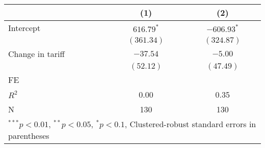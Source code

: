 
\begin{tabular}{l c c }
\hline
 & (1) & (2) \\
\hline
Intercept & $616.79^{*}$ & $-606.93^{*}$ \\
            & $(361.34)$   & $(324.87)$    \\
Change in tariff     & $-37.54$     & $-5.00$       \\
            & $(52.12)$    & $(47.49)$     \\
\hline
FE          &                &                \\ 
\hline
$R^2$       & 0.00         & 0.35          \\
N           & 130          & 130           \\
\hline
\multicolumn{3}{l}{\scriptsize{$^{***}p<0.01$, $^{**}p<0.05$, $^*p<0.1$, Clustered-robust standard errors in parentheses}}
\end{tabular}
